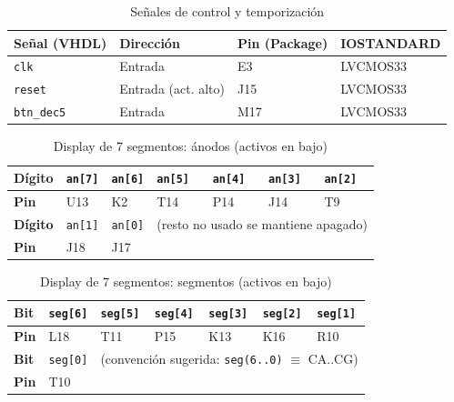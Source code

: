 \documentclass[a4paper,12pt]{article}
\begin{document}
\begin{table}[H]
  \centering
  \small
  \caption{Señales de control y temporización}
  \label{tab:pines-control}
  \begin{tabular}{@{}llll@{}}
    \toprule
    \textbf{Señal (VHDL)} & \textbf{Dirección} & \textbf{Pin (Package)} & \textbf{IOSTANDARD} \\
    \midrule
    \texttt{clk}          & Entrada            & E3                     & LVCMOS33 \\
    \texttt{reset}        & Entrada (act. alto)& J15                    & LVCMOS33 \\
    \texttt{btn\_dec5}    & Entrada            & M17                    & LVCMOS33 \\
    \bottomrule
  \end{tabular}
\end{table}

\begin{table}[H]
  \centering
  \small
  \caption{Display de 7 segmentos: ánodos (activos en bajo)}
  \label{tab:pines-anodos}
  \begin{tabular}{@{}lllllll@{}}
    \toprule
    \textbf{Dígito} & \texttt{an[7]} & \texttt{an[6]} & \texttt{an[5]} & \texttt{an[4]} & \texttt{an[3]} & \texttt{an[2]} \\
    \midrule
    \textbf{Pin}    & U13            & K2             & T14            & P14            & J14            & T9 \\
    \midrule
    \textbf{Dígito} & \texttt{an[1]} & \texttt{an[0]} & \multicolumn{4}{l}{(resto no usado se mantiene apagado)} \\
    \textbf{Pin}    & J18            & J17            & \multicolumn{4}{l}{} \\
    \bottomrule
  \end{tabular}
\end{table}

\begin{table}[H]
  \centering
  \small
  \caption{Display de 7 segmentos: segmentos (activos en bajo)}
  \label{tab:pines-segmentos}
  \begin{tabular}{@{}lllllll@{}}
    \toprule
    \textbf{Bit} & \texttt{seg[6]} & \texttt{seg[5]} & \texttt{seg[4]} & \texttt{seg[3]} & \texttt{seg[2]} & \texttt{seg[1]} \\
    \midrule
    \textbf{Pin} & L18            & T11             & P15             & K13             & K16             & R10 \\
    \midrule
    \textbf{Bit} & \texttt{seg[0]} & \multicolumn{5}{l}{(convención sugerida: \texttt{seg(6..0)} $\equiv$ CA..CG)} \\
    \textbf{Pin} & T10             & \multicolumn{5}{l}{} \\
    \bottomrule
  \end{tabular}
\end{table}
\end{document}
